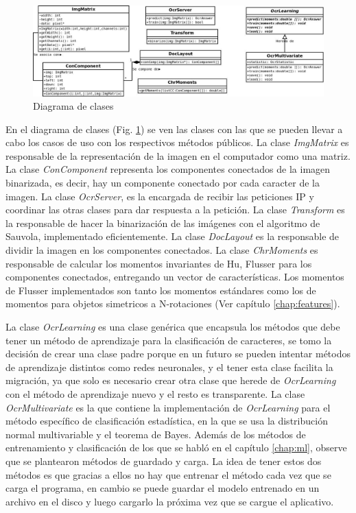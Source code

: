 \documentclass[a4paper, 11pt, oneside]{report}
\begin{document}
\begin{figure}
\begin{center}
\includegraphics[width=20cm]{diagrams/clases.jpg}
\end{center}
\caption{Diagrama de clases}
\label{fig:classes}
\end{figure}

En el diagrama de clases (Fig. \ref{fig:classes}) se ven las clases con las que se pueden llevar a cabo los casos de uso con los respectivos métodos públicos. La clase {\it ImgMatrix} es responsable de la representación de la imagen en el computador como una matriz. La clase {\it ConComponent} representa los componentes conectados de la imagen binarizada, es decir, hay un componente conectado por cada caracter de la imagen. La clase {\it OcrServer}, es la encargada de recibir las peticiones IP y coordinar las otras clases para dar respuesta a la petición. La clase {\it Transform} es la responsable de hacer la binarización de las imágenes con el algoritmo de Sauvola, implementado eficientemente. La clase {\it DocLayout} es la responsable de dividir la imagen en los componentes conectados. La clase {\it ChrMoments} es responsable de calcular los momentos invariantes de Hu, Flusser para los componentes conectados, entregando un vector de características. Los momentos de Flusser implementados son tanto los momentos estándares como  los de momentos para objetos simetricos a N-rotaciones (Ver capítulo \ref{chap:features}).

La clase {\it OcrLearning} es una clase genérica que encapsula los métodos que debe tener un método de aprendizaje para la clasificación de caracteres, se tomo la decisión de crear una clase padre porque en un futuro se pueden intentar métodos de aprendizaje distintos como redes neuronales, y el tener esta clase facilita la migración, ya que solo es necesario crear otra clase que herede de {\it OcrLearning} con el método de aprendizaje nuevo y el resto es transparente. La clase {\it OcrMultivariate} es la que contiene la implementación de {\it OcrLearning} para el método específico de clasificación estadística, en la que se usa la distribución normal multivariable y el teorema de Bayes. Además de los métodos de entrenamiento y clasificación de los que se habló en el capítulo \ref{chap:ml}, observe que se plantearon métodos de guardado y carga. La idea de tener estos dos métodos es que gracias a ellos no hay que entrenar el método cada vez que se carga el programa, en cambio se puede guardar el modelo entrenado en un archivo en el disco y luego cargarlo la próxima vez que se cargue el aplicativo.
\end{document}

